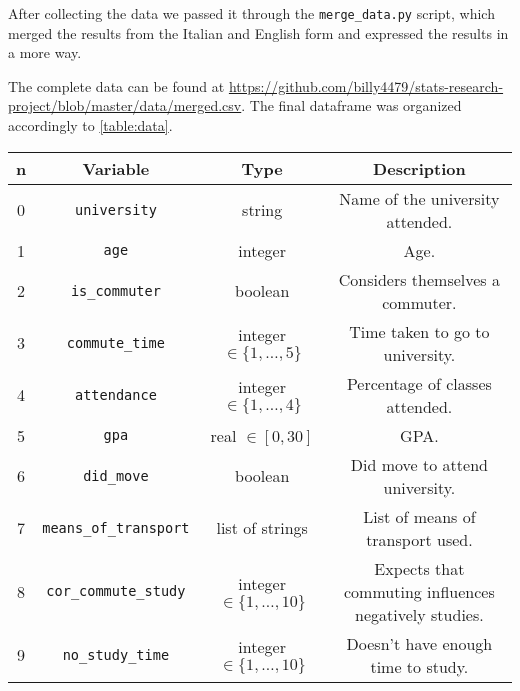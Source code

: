 \documentclass[11pt]{extarticle}
\numberwithin{table}{section}
\numberwithin{figure}{section}
\numberwithin{equation}{section}
\begin{document}
After collecting the data we passed it through the \texttt{merge\_data.py} script,
which merged the results from the Italian and English form and expressed the results in a more
 way.

The complete data can be found at
\url{https://github.com/billy4479/stats-research-project/blob/master/data/merged.csv}.
The final dataframe was organized accordingly to \cref{table:data}.

\begin{table}[!ht]
	\begin{center}
		\begin{tabular}{|c|c|c|c|}
			\hline
			\textbf{n} & \textbf{Variable}                & \textbf{Type}                  & \textbf{Description}                           \\
			\hline
			\hline
			0          & \texttt{university}              & string                         & Name of the university attended.               \\
			\hline
			1          & \texttt{age}                     & integer                        & Age.                                           \\
			\hline
			2          & \texttt{is\_commuter}            & boolean                        & Considers themselves a commuter.               \\
			\hline
			3          & \texttt{commute\_time}           & integer $\in \{1, \dots, 5\}$  & Time taken to go to university.                \\
			\hline
			4          & \texttt{attendance}              & integer $\in \{1, \dots, 4\}$  & Percentage of classes attended.                \\
			\hline
			5          & \texttt{gpa}                     & real $\in [0,30]$              & GPA.                                           \\
			\hline
			6          & \texttt{did\_move}               & boolean                        & Did move to attend university.                 \\
			\hline
			7          & \texttt{means\_of\_transport}    & list of strings                & List of means of transport used.               \\
			\hline
			8          & \texttt{cor\_commute\_study}     & integer $\in \{1, \dots, 10\}$ & \makecell{Expects that commuting influences    \\negatively studies.}              \\
			\hline
			9          & \texttt{no\_study\_time}         & integer $\in \{1, \dots, 10\}$ & Doesn't have enough time to study.             \\

\end{tabular}
\end{center}
\end{table}
\end{document}
